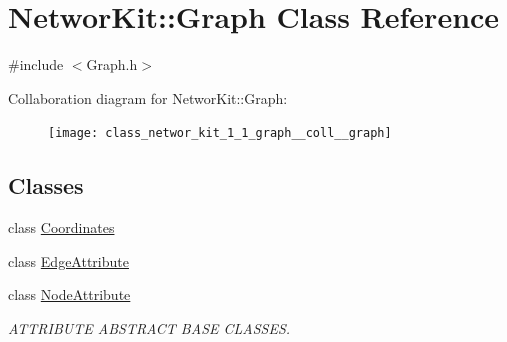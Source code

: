 \hypertarget{class_networ_kit_1_1_graph}{\section{Networ\-Kit\-:\-:Graph Class Reference}
\label{class_networ_kit_1_1_graph}
}


{\ttfamily \#include $<$Graph.\-h$>$}



Collaboration diagram for Networ\-Kit\-:\-:Graph\-:
\nopagebreak
\begin{figure}[H]
\begin{center}
\leavevmode
\texttt{[image: class\_networ\_kit\_1\_1\_graph\_\_coll\_\_graph]}
\end{center}
\end{figure}
\subsection*{Classes}
\begin{DoxyCompactItemize}
\item 
class \hyperlink{class_networ_kit_1_1_graph_1_1_coordinates}{Coordinates}
\item 
class \hyperlink{class_networ_kit_1_1_graph_1_1_edge_attribute}{Edge\-Attribute}
\item 
class \hyperlink{class_networ_kit_1_1_graph_1_1_node_attribute}{Node\-Attribute}
\begin{DoxyCompactList}\small\item\em A\-T\-T\-R\-I\-B\-U\-T\-E A\-B\-S\-T\-R\-A\-C\-T B\-A\-S\-E C\-L\-A\-S\-S\-E\-S. \end{DoxyCompactList}\end{DoxyCompactItemize}
